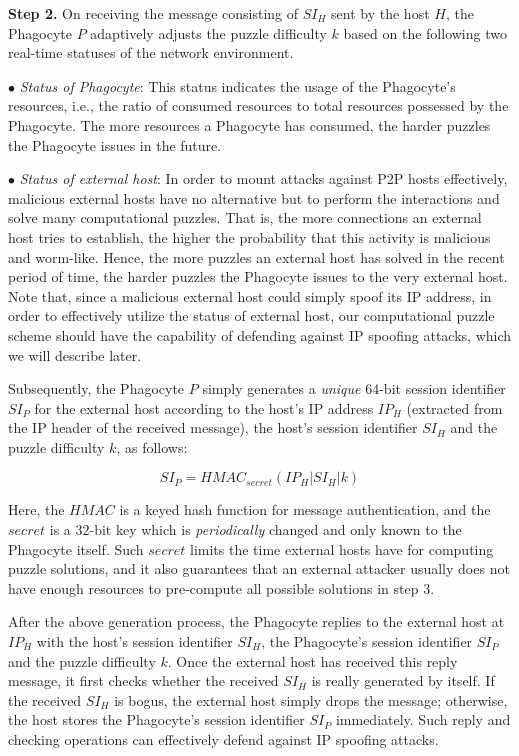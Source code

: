 \documentclass[times,10pt,twocolumn]{article}
\begin{document}
\textbf{Step 2.} On receiving the message consisting of $SI_H$ sent
by the host $H$, the Phagocyte $P$ adaptively adjusts the puzzle
difficulty $k$ based on the following two real-time statuses of the
network environment.



$\bullet$ \emph{Status of Phagocyte}: This status indicates the
usage of the Phagocyte's resources, i.e., the ratio of consumed
resources to total resources possessed by the Phagocyte. The more
resources a Phagocyte has consumed, the harder puzzles the Phagocyte
issues in the future.

$\bullet$ \emph{Status of external host}: In order to mount attacks
against P2P hosts effectively, malicious external hosts have no
alternative but to perform the interactions and solve many
computational puzzles. That is, the more connections an external
host tries to establish, the higher the probability that this
activity is malicious and worm-like. Hence, the more puzzles an
external host has solved in the recent period of time, the harder
puzzles the Phagocyte issues to the very external host. Note that,
since a malicious external host could simply spoof its IP address,
in order to effectively utilize the status of external host, our
computational puzzle scheme should have the capability of defending
against IP spoofing attacks, which we will describe later.





Subsequently, the Phagocyte $P$ simply generates a \emph{unique}
$64$-bit session identifier $SI_P$ for the external host according
to the host's IP address $IP_H$ (extracted from the IP header of the
received message), the host's session identifier $SI_H$ and the
puzzle difficulty $k$, as follows:


\begin{equation} \label{eqn:sip}
SI_P = HMAC_{secret} \left( IP_H | SI_H | k \right)
\end{equation}

\noindent Here, the $HMAC$ is a keyed hash function for message
authentication, and the $secret$ is a $32$-bit key which is
\emph{periodically} changed and only known to the Phagocyte itself.
Such $secret$ limits the time external hosts have for computing
puzzle solutions, and it also guarantees that an external attacker
usually does not have enough resources to pre-compute all possible
solutions in step 3.


After the above generation process, the Phagocyte replies to the
external host at $IP_H$ with the host's session identifier $SI_H$,
the Phagocyte's session identifier $SI_P$ and the puzzle difficulty
$k$. Once the external host has received this reply message, it
first checks whether the received $SI_H$ is really generated by
itself. If the received $SI_H$ is bogus, the external host simply
drops the message; otherwise, the host stores the Phagocyte's
session identifier $SI_P$ immediately. Such reply and checking
operations can effectively defend against IP spoofing attacks.
\end{document}
